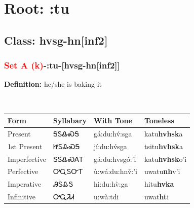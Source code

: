 \needspace{4in}
\section*{Root: :tu}
\nopagebreak
{}
\needspace{3in}
\subsection*{Class: hvsg-hn[inf2]}
\nopagebreak
\needspace{2in}
\subsubsection*{\textcolor{Red}{Set A (k)}{-}\textbf{:tu}{-}[hvsg-hn[inf2]]}
\nopagebreak
\textbf{Definition: } he/she is baking it
\\[0.5em]
\begin{tabularx}{\textwidth}{l X X X}%
\toprule%
\textbf{Form}&\textbf{Syllabary}&\textbf{With Tone}&\textbf{Toneless}\\%
\midrule%
Present&ᎦᏚᎲᏍᎦ&gá:du:hv́:sga&katu\textbf{hvhsk}a\\%
1st Present&ᏥᏚᎲᏍᎦ&jí:du:hv́sga&tsitu\textbf{hvhsk}a\\%
Imperfective&ᎦᏚᎲᏍᎪᎢ&gá:du:hvsgó:’i&katu\textbf{hvhsk}o'i\\%
Perfective&ᎤᏩᏚᏅᎢ&ù:wá:du:hnv̌:’i&uwatu\textbf{nh}v'i\\%
Imperative&ᎯᏚᎲᎦ&hì:du:hv̀:ga&hitu\textbf{hvka}\\%
Infinitive&ᎤᏩᏘᏗ&u:wà:tdi&uwat\textbf{ht}i\\%
\bottomrule%
\end{tabularx}
\\[1em]